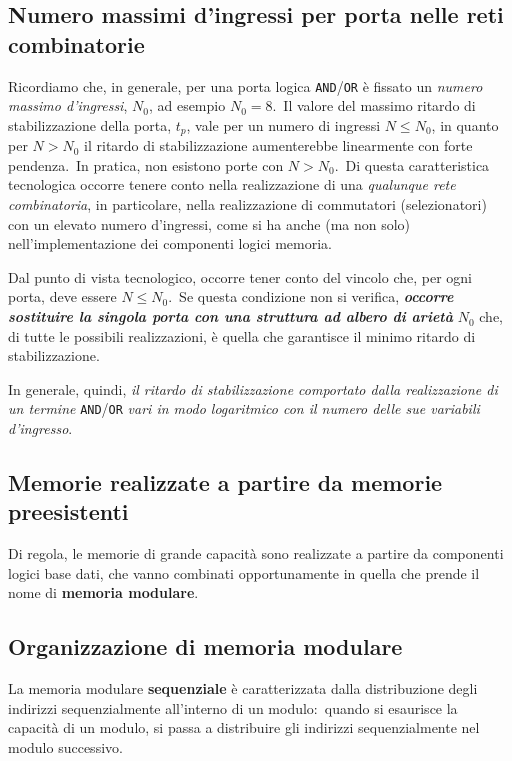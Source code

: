 \subsection{Numero massimi d'ingressi per porta nelle reti combinatorie}

Ricordiamo che, in generale, per una porta logica \texttt{AND}/\texttt{OR} è fissato un \textit{numero massimo d'ingressi}, $N_0$, ad esempio $N_0 = 8$.\
Il valore del massimo ritardo di stabilizzazione della porta, $t_p$, vale per un numero di ingressi $N \leq N_0$, in quanto per $ N > N_0$ il ritardo di stabilizzazione aumenterebbe linearmente con forte pendenza.\
In pratica, non esistono porte con $N > N_0$.\
Di questa caratteristica tecnologica occorre tenere conto nella realizzazione di una \textit{qualunque rete combinatoria}, in particolare, nella realizzazione di commutatori (selezionatori) con un elevato numero d'ingressi, come si ha anche (ma non solo) nell'implementazione dei componenti logici memoria.

Dal punto di vista tecnologico, occorre tener conto del vincolo che, per ogni porta, deve essere $N \leq N_0$.\
Se questa condizione non si verifica, \textbf{\textit{occorre sostituire la singola porta con una struttura ad albero di arietà}} $N_0$ che, di tutte le possibili realizzazioni, è quella che garantisce il minimo ritardo di stabilizzazione.

In generale, quindi, \textit{il ritardo di stabilizzazione comportato dalla realizzazione di un termine} \texttt{AND}/\texttt{OR} \textit{vari in modo logaritmico con il numero delle sue variabili d'ingresso}.

\subsection{Memorie realizzate a partire da memorie preesistenti}

Di regola, le memorie di grande capacità sono realizzate a partire da componenti logici base dati, che vanno combinati opportunamente in quella che prende il nome di \textbf{memoria modulare}.

\subsection{Organizzazione di memoria modulare}

La memoria modulare \textbf{sequenziale} è caratterizzata dalla distribuzione degli indirizzi sequenzialmente all'interno di un modulo:\ quando si esaurisce la capacità di un modulo, si passa a distribuire gli indirizzi sequenzialmente nel modulo successivo.

